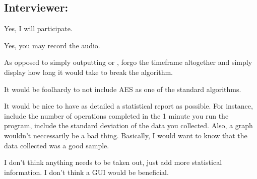 \subsection{Interviewer: \md}


\begin{answer}{1}
Yes, I will participate.
\end{answer}


\begin{answer}{2}
Yes, you may record the audio.
\end{answer}


\begin{answer}{3}
As opposed to simply outputting  or , forgo the
timeframe altogether and simply display how long it would
take to break the algorithm.
\end{answer}


\begin{answer}{4}
It would be foolhardy to not include AES as one of the
standard algorithms.
\end{answer}


\begin{answer}{5}
It would be nice to have as detailed a statistical report
as possible. For instance, include the number of operations
completed in the 1 minute you run the program, include the
standard deviation of the data you collected. Also, a graph
wouldn't neccessarily be a bad thing. Basically, I would want
to know that the data collected was a good sample.
\end{answer}


\begin{answer}{6}
I don't think anything needs to be taken out, just add more
statistical information. I don't think a GUI would be
beneficial.
\end{answer}

